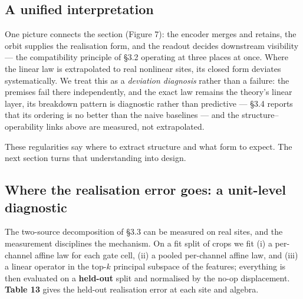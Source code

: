 \subsection{A unified interpretation}

One picture connects the section (Figure 7): the encoder merges and retains, the orbit supplies the realisation form, and the readout decides downstream visibility --- the compatibility principle of \S{}3.2 operating at three places at once. Where the linear law is extrapolated to real nonlinear sites, its closed form deviates systematically. We treat this as a \textit{deviation diagnosis} rather than a failure: the premises fail there independently, and the exact law remains the theory's linear layer, its breakdown pattern is diagnostic rather than predictive --- \S{}3.4 reports that its ordering is no better than the naive baselines --- and the structure--operability links above are measured, not extrapolated.

These regularities say where to extract structure and what form to expect. The next section turns that understanding into design.

\subsection{Where the realisation error goes: a unit-level diagnostic}

The two-source decomposition of \S{}3.3 can be measured on real sites, and the measurement disciplines the mechanism. On a fit split of crops we fit (i) a per-channel affine law for each gate cell, (ii) a pooled per-channel affine law, and (iii) a linear operator in the top-$k$ principal subspace of the features; everything is then evaluated on a \textbf{held-out} split and normalised by the no-op displacement. \textbf{Table 13} gives the held-out realisation error at each site and algebra.


